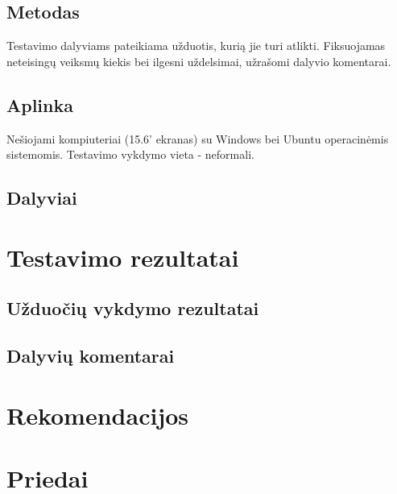 	\subsection{Metodas}
	
		Testavimo dalyviams pateikiama užduotis, kurią jie turi atlikti.
		Fiksuojamas neteisingų veiksmų kiekis bei ilgesni uždelsimai, užrašomi dalyvio komentarai.
	
	\subsection{Aplinka}
	
		Nešiojami kompiuteriai (15.6' ekranas) su Windows bei Ubuntu operacinėmis sistemomis.
		Testavimo vykdymo vieta - neformali.
	
	\subsection{Dalyviai}
	
	

\section{Testavimo rezultatai}

	\subsection{Užduočių vykdymo rezultatai}
	
	\subsection{Dalyvių komentarai}

\section{Rekomendacijos}

	

\section{Priedai}

